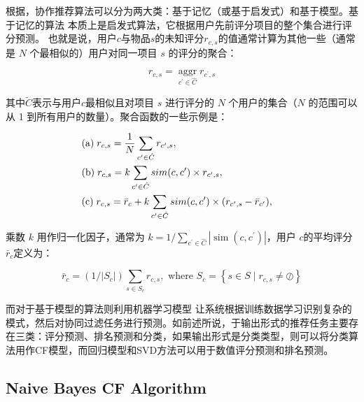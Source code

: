 \documentclass[sigconf]{acmart}
\begin{document}
根据\cite{breese2013empirical}，协作推荐算法可以分为两大类：基于记忆（或基于启发式）和基于模型。基于记忆的算法 \cite{breese2013empirical, delgado1999memory, nakamura1998collaborative, resnick1994grouplens,shardanand1995social}本质上是启发式算法，它根据用户先前评分项目的整个集合进行评分预测。 也就是说，用户$c$与物品$s$的未知评分$r_{c,s}$的值通常计算为其他一些（通常是 $N$ 个最相似的）用户对同一项目 $s$ 的评分的聚合：

\begin{equation}
  r_{c, s}=\underset{c^{\prime} \in \hat{C}}{\operatorname{aggr}} r_{c^{\prime}, s}
\end{equation}

其中$\tilde{C}$表示与用户$c$最相似且对项目 $s$ 进行评分的 $N$ 个用户的集合（$N$ 的范围可以从 1 到所有用户的数量）。聚合函数的一些示例是：

\begin{equation}
  \begin{aligned}
    &{\rm{(a) }}\;r_{c, s} = {1 \over N}\sum\limits_{c^{\prime} \in \hat C}{r_{c^{\prime}, s}},\cr& {\rm{ (b) }}\;r_{c, s} = k\sum\limits_{c^{\prime} \in \hat C}{sim(c, c^{\prime}) \times r_{c^{\prime}, s}},\cr& {\rm{ (c) }}\;r_{c, s} = \bar r_c + k\sum\limits_{c^{\prime} \in \hat C}{sim(c, c^{\prime}) \times (r_{c^{\prime}, s} - \bar r_{c^{\prime}})},
  \end{aligned}
\end{equation}

乘数 $k$ 用作归一化因子，通常为 $k=1 / \sum_{c^{\prime} \in \hat{C}}\left|\operatorname{sim}\left(c, c^{\prime}\right)\right|$，用户 $c$的平均评分 $\bar{r}_{c}$定义为：

\begin{equation}
  \bar{r}_{c}=\left(1 /\left|S_{c}\right|\right) \sum_{s \in S_{c}} r_{c, s}, \text { where } S_{c}=\left\{s \in S \mid r_{c, s} \neq \oslash\right\}  
\end{equation}

而对于基于模型的算法则利用机器学习模型\cite{billsus1998learning,breese2013empirical, getoor1999using, goldberg2001eigentaste, hofmann2003collaborative, marlin2003modeling, pavlov2002maximum, ungar1998clustering} 让系统根据训练数据学习识别复杂的模式，然后对协同过滤任务进行预测。如前述所说，于输出形式的推荐任务主要存在三类：评分预测、排名预测和分类，如果输出形式是分类类型，则可以将分类算法用作CF模型，而回归模型和SVD方法可以用于数值评分预测和排名预测。

\subsection{Naive Bayes CF Algorithm}
\end{document}
